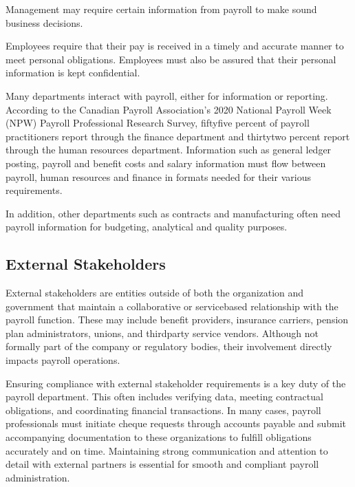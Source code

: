 \documentclass[letterpaper,10pt,english]{sphinxmanual}
\begin{document}
\sphinxAtStartPar
{} \sphinxhyphen{} Management may require certain information from payroll to make sound
business decisions.

\sphinxAtStartPar
{} \sphinxhyphen{} Employees require that their pay is received in a timely and accurate manner to
meet personal obligations. Employees must also be assured that their personal information is
kept confidential.

\sphinxAtStartPar
{} \sphinxhyphen{} Many departments interact with payroll, either for information or
reporting. According to the Canadian Payroll Association’s 2020 National Payroll Week
(NPW) Payroll Professional Research Survey, fifty\sphinxhyphen{}five percent of payroll practitioners
report through the finance department and thirty\sphinxhyphen{}two percent report through the human
resources department. Information such as general ledger posting, payroll and benefit costs
and salary information must flow between payroll, human resources and finance in formats
needed for their various requirements.

\sphinxAtStartPar
In addition, other departments such as contracts and manufacturing often need payroll
information for budgeting, analytical and quality purposes.


\subsection{External Stakeholders}
\label{\detokenize{compliance:external-stakeholders}}
\sphinxAtStartPar
External stakeholders are entities outside of both the organization and government that maintain a collaborative or
service\sphinxhyphen{}based relationship with the payroll function. These may include benefit providers, insurance carriers, pension
plan administrators, unions, and third\sphinxhyphen{}party service vendors. Although not formally part of the company or regulatory bodies,
their involvement directly impacts payroll operations.

\sphinxAtStartPar
Ensuring compliance with external stakeholder requirements is a key duty of the payroll department. This often includes
verifying data, meeting contractual obligations, and coordinating financial transactions. In many cases, payroll
professionals must initiate cheque requests through accounts payable and submit accompanying documentation to these
organizations to fulfill obligations accurately and on time. Maintaining strong communication and attention to detail with
external partners is essential for smooth and compliant payroll administration.
\end{document}
